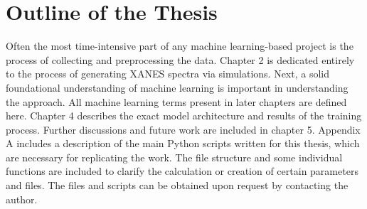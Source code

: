 \section{Outline of the Thesis}
Often the most time-intensive part of any machine learning-based project is the process of collecting and preprocessing the data. Chapter 2 is dedicated entirely to the process of generating XANES spectra via simulations. Next, a solid foundational understanding of machine learning is important in understanding the approach. All machine learning terms present in later chapters are defined here.  Chapter 4 describes the exact model architecture and results of the training process. Further discussions and future work are included in chapter 5. Appendix A includes a description of the main Python scripts written for this thesis, which are necessary for replicating the work. The file structure and some individual functions are included to clarify the calculation or creation of certain parameters and files. The files and scripts can be obtained upon request by contacting the author.
